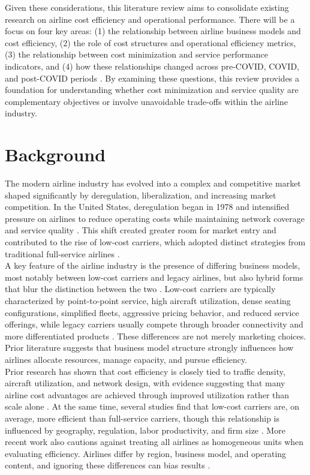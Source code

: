 \documentclass[11pt, letterpaper]{article}
\begin{document}
\indent Given these considerations, this literature review aims to consolidate existing research on airline cost efficiency and operational performance. There will be a focus on four key areas: (1) the relationship between airline business models and cost efficiency, (2) the role of cost structures and operational efficiency metrics, (3) the relationship between cost minimization and service performance indicators, and (4) how these relationships changed across pre-COVID, COVID, and post-COVID periods \cite{FontanetPerez2022,Gudmundsson2021,Nguyen2022}. By examining these questions, this review provides a foundation for understanding whether cost minimization and service quality are complementary objectives or involve unavoidable trade-offs within the airline industry.

\section{Background}
The modern airline industry has evolved into a complex and competitive market shaped significantly by deregulation, liberalization, and increasing market competition. In the United States, deregulation began in 1978 and intensified pressure on airlines to reduce operating costs while maintaining network coverage and service quality \cite{Borenstein1992}. This shift created greater room for market entry and contributed to the rise of low-cost carriers, which adopted distinct strategies from traditional full-service airlines \cite{Gillen2005,GillenLall2004}.\\
\indent A key feature of the airline industry is the presence of differing business models, most notably between low-cost carriers and legacy airlines, but also hybrid forms that blur the distinction between the two \cite{FontanetPerez2022,Gudmundsson2023}. Low-cost carriers are typically characterized by point-to-point service, high aircraft utilization, dense seating configurations, simplified fleets, aggressive pricing behavior, and reduced service offerings, while legacy carriers usually compete through broader connectivity and more differentiated products \cite{Barbot2008,FontanetPerez2022,GillenLall2004,Gudmundsson2023,Lim2015,OConnell2005}. These differences are not merely marketing choices. Prior literature suggests that business model structure strongly influences how airlines allocate resources, manage capacity, and pursue efficiency.\\
\indent Prior research has shown that cost efficiency is closely tied to traffic density, aircraft utilization, and network design, with evidence suggesting that many airline cost advantages are achieved through improved utilization rather than scale alone \cite{Banker1993,Caves1984,Zuidberg2014}. At the same time, several studies find that low-cost carriers are, on average, more efficient than full-service carriers, though this relationship is influenced by geography, regulation, labor productivity, and firm size \cite{Barbot2008}. More recent work also cautions against treating all airlines as homogeneous units when evaluating efficiency. Airlines differ by region, business model, and operating content, and ignoring these differences can bias results \cite{Li2025}.\\
\end{document}
